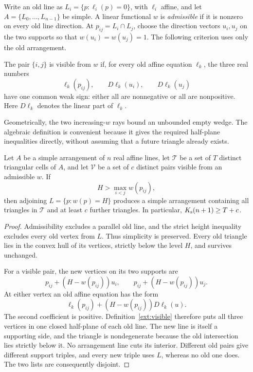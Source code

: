 Write an old line as $L_i=\{p:\ell_i(p)=0\}$, with $\ell_i$ affine, and let
$A=\{L_0,\ldots,L_{n-1}\}$ be simple.  A linear functional $w$ is
\emph{admissible} if it is nonzero on every old line direction.  At
$p_{ij}=L_i\cap L_j$, choose the direction vectors $u_i,u_j$ on the two
supports so that $w(u_i)=w(u_j)=1$.  The following criterion uses only the
old arrangement.

\begin{definition}
\label{ext:visible}
The pair $\{i,j\}$ is visible from $w$ if, for every old affine equation
$\ell_k$, the three real numbers
\[
  \ell_k(p_{ij}),\qquad D\ell_k(u_i),\qquad D\ell_k(u_j)
\]
have one common weak sign: either all are nonnegative or all are
nonpositive.  Here $D\ell_k$ denotes the linear part of $\ell_k$.
\end{definition}

Geometrically, the two increasing-$w$ rays bound an unbounded empty wedge.
The algebraic definition is convenient because it gives the required
half-plane inequalities directly, without assuming that a future triangle
already exists.

\begin{theorem}
\label{ext:realization}
Let $A$ be a simple arrangement of $n$ real affine lines, let $\mathcal T$
be a set of $T$ distinct triangular cells of $A$, and let $\mathcal V$ be
a set of $c$ distinct pairs visible from an admissible $w$.  If
\[
  H>\max_{i<j}w(p_{ij}),
\]
then adjoining $L=\{p:w(p)=H\}$ produces a simple arrangement containing
all triangles in $\mathcal T$ and at least $c$ further triangles.  In
particular, $K_{\mathrm{s}}(n+1)\geq T+c$.
\end{theorem}

\begin{proof}
Admissibility excludes a parallel old line, and the strict height
inequality excludes every old vertex from $L$.  Thus simplicity is
preserved.  Every old triangle lies in the convex hull of its vertices,
strictly below the level $H$, and survives unchanged.

For a visible pair, the new vertices on its two supports are
\[
 p_{ij}+(H-w(p_{ij}))u_i,
 \qquad p_{ij}+(H-w(p_{ij}))u_j.
\]
At either vertex an old affine equation has the form
\[
 \ell_k(p_{ij})+(H-w(p_{ij}))D\ell_k(u).
\]
The second coefficient is positive.  Definition~\ref{ext:visible}
therefore puts all three vertices in one closed half-plane of each old
line.  The new line is itself a supporting side, and the triangle is
nondegenerate because the old intersection lies strictly below it.  No
arrangement line cuts its interior.  Different old pairs give different
support triples, and every new triple uses $L$, whereas no old one does.
The two lists are consequently disjoint.
\end{proof}

